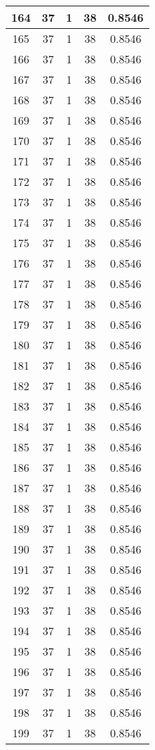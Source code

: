 \documentclass[letterpaper, 12pt]{article}
\begin{document}
\begin{longtable}{|c|c|c|c|c|}
\hline
164 & 37 & 1 & 38 & 0.8546 \\
\hline
165 & 37 & 1 & 38 & 0.8546 \\
\hline
166 & 37 & 1 & 38 & 0.8546 \\
\hline
167 & 37 & 1 & 38 & 0.8546 \\
\hline
168 & 37 & 1 & 38 & 0.8546 \\
\hline
169 & 37 & 1 & 38 & 0.8546 \\
\hline
170 & 37 & 1 & 38 & 0.8546 \\
\hline
171 & 37 & 1 & 38 & 0.8546 \\
\hline
172 & 37 & 1 & 38 & 0.8546 \\
\hline
173 & 37 & 1 & 38 & 0.8546 \\
\hline
174 & 37 & 1 & 38 & 0.8546 \\
\hline
175 & 37 & 1 & 38 & 0.8546 \\
\hline
176 & 37 & 1 & 38 & 0.8546 \\
\hline
177 & 37 & 1 & 38 & 0.8546 \\
\hline
178 & 37 & 1 & 38 & 0.8546 \\
\hline
179 & 37 & 1 & 38 & 0.8546 \\
\hline
180 & 37 & 1 & 38 & 0.8546 \\
\hline
181 & 37 & 1 & 38 & 0.8546 \\
\hline
182 & 37 & 1 & 38 & 0.8546 \\
\hline
183 & 37 & 1 & 38 & 0.8546 \\
\hline
184 & 37 & 1 & 38 & 0.8546 \\
\hline
185 & 37 & 1 & 38 & 0.8546 \\
\hline
186 & 37 & 1 & 38 & 0.8546 \\
\hline
187 & 37 & 1 & 38 & 0.8546 \\
\hline
188 & 37 & 1 & 38 & 0.8546 \\
\hline
189 & 37 & 1 & 38 & 0.8546 \\
\hline
190 & 37 & 1 & 38 & 0.8546 \\
\hline
191 & 37 & 1 & 38 & 0.8546 \\
\hline
192 & 37 & 1 & 38 & 0.8546 \\
\hline
193 & 37 & 1 & 38 & 0.8546 \\
\hline
194 & 37 & 1 & 38 & 0.8546 \\
\hline
195 & 37 & 1 & 38 & 0.8546 \\
\hline
196 & 37 & 1 & 38 & 0.8546 \\
\hline
197 & 37 & 1 & 38 & 0.8546 \\
\hline
198 & 37 & 1 & 38 & 0.8546 \\
\hline
199 & 37 & 1 & 38 & 0.8546 \\
\hline
\end{longtable}
\end{document}
